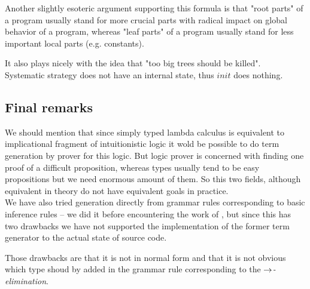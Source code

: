 \documentclass[12pt,a4paper]{report}
\newenvironment{todo}
{ ~\\[0.5em]
  {\color{red}\textbf{TODO}}
  \begin{easylist}[itemize]}
{ \end{easylist}
  ~}
\begin{document}
Another slightly esoteric argument supporting this formula is that "root 
parts" of a program usually stand for more crucial parts
with radical impact on global behavior of a program, 
whereas "leaf parts" of a program usually
stand for less important local parts (e.g. constants).  

It also plays nicely with the idea that "too big trees should be killed".\\



Systematic strategy does not have an internal state, thus $init$ does nothing.


\subsection{Final remarks}
We should mention that since simply typed lambda calculus
is equivalent to implicational fragment of intuitionistic logic
it wold be possible to do term generation by prover for this logic. But logic prover is concerned with finding one proof of a difficult
proposition, whereas types usually tend to be easy propositions
but we need enormous amount of them. So this two fields, although 
equivalent in theory do not have equivalent goals in practice.\\

We have also tried generation directly from grammar rules
corresponding to basic inference rules -- we did it before
encountering the work of \cite{barendregt10}, but since this has two
drawbacks we have not supported the implementation of the former
term generator to the actual state of source code. 

Those drawbacks are that it is not in normal form and that
it is not obvious which type shoud by added in the grammar 
rule corresponding to the \textit{$\rightarrow$-elimination}.

% 
% 
%
%
% 
\end{document}
